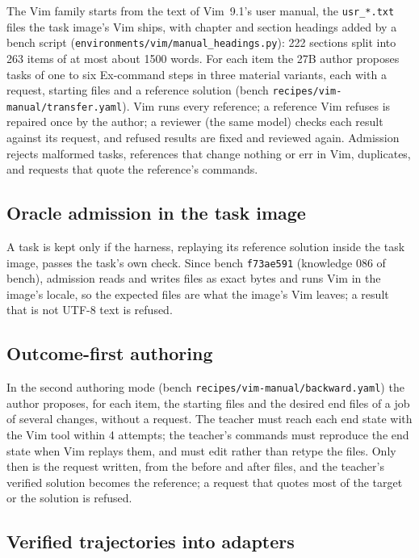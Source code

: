 The Vim family starts from the text of Vim~9.1's user manual, the \texttt{usr\_*.txt} files the task image's Vim ships,
with chapter and section headings added by a bench script (\nolinkurl{environments/vim/manual_headings.py}): 222 sections
split into 263 items of at most about 1500 words. For each item the 27B author proposes tasks of one to six Ex-command steps in three
material variants, each with a request, starting files and a reference solution (bench
\nolinkurl{recipes/vim-manual/transfer.yaml}). Vim runs every reference; a reference Vim refuses is repaired once by the author;
a reviewer (the same model) checks each result against its request, and refused results are fixed and reviewed again.
Admission rejects malformed tasks, references that change nothing or err in Vim, duplicates, and requests that quote the
reference's commands.

\subsection{Oracle admission in the task image}\label{sec:m-admission}

A task is kept only if the harness, replaying its reference solution inside the task image, passes the task's own check.
Since bench \texttt{f73ae591} (knowledge 086 of bench), admission reads and writes files as exact bytes and runs Vim in the
image's locale, so the expected files are what the image's Vim leaves; a result that is not UTF-8 text is refused.

\subsection{Outcome-first authoring}\label{sec:m-outcome}

In the second authoring mode (bench \nolinkurl{recipes/vim-manual/backward.yaml}) the author proposes, for each item, the
starting files and the desired end files of a job of several changes, without a request. The teacher must reach each end state
with the Vim tool within 4 attempts; the teacher's commands must reproduce the end state when Vim replays them, and must edit
rather than retype the files. Only then is the request written, from the before and after files, and the teacher's verified
solution becomes the reference; a request that quotes most of the target or the solution is refused.


\subsection{Verified trajectories into adapters}\label{sec:m-adapters}

